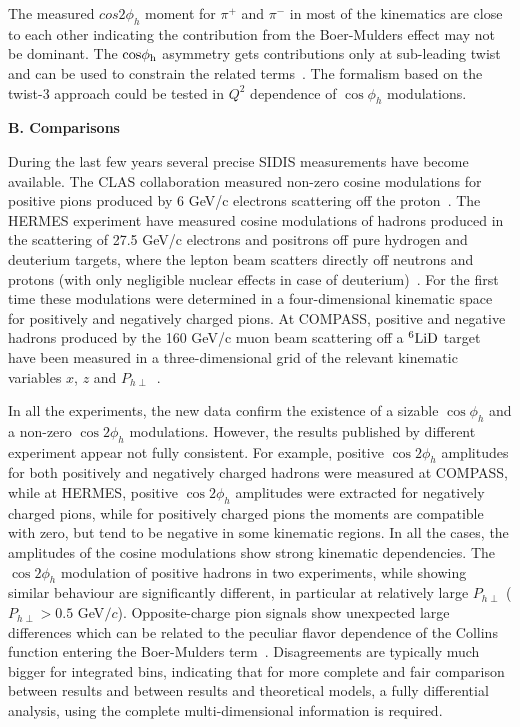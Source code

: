 \documentclass[aps,prl,twocolumn,showpacs,superscriptaddress,groupedaddress]{revtex4-1}  %
\newcommand{\Phperp}{P_{h\perp}}
\begin{document}
The measured $cos 2 \phi_h$ moment for $\pi^+$ and $\pi^-$ in most of the kinematics are close to each other indicating the contribution from the Boer-Mulders effect may not be dominant.
The $\rm cos \phi_h$ asymmetry gets contributions only at sub-leading twist and can be used to constrain the related terms~\cite{Cahn:1978se,Anselmino:2005nn,Berger:1979xz}.
The formalism based on the twist-3 approach could be tested in $Q^2$ dependence of $\cos\phi_h$ modulations.

\begin{center}
\textbf{B. Comparisons} \par
\end{center}
During the last few years several precise SIDIS measurements have become available. The CLAS
collaboration measured non-zero cosine modulations for positive pions produced
by 6 GeV/c electrons scattering off the proton~\cite{Osipenko:2008rv}.  The
HERMES experiment have measured cosine modulations of hadrons produced in the
scattering of 27.5 GeV/c electrons and positrons off pure hydrogen and deuterium
targets, where the lepton beam scatters directly off neutrons and protons (with
only negligible nuclear effects in case of
deuterium)~\cite{Airapetian:2012yg}. For the first time these modulations were
determined in a four-dimensional kinematic space for positively and negatively
charged pions.
At COMPASS, positive and negative hadrons produced by the 160 GeV/c muon beam
scattering off a $\rm ^6LiD$ target have been measured in a three-dimensional
grid of the relevant kinematic variables $x$, $z$ and
$\Phperp$~\cite{Adolph:2014pwc}.

In all the experiments, the new data confirm the existence of a sizable
$\cos\phi_h$ and a non-zero $\cos2\phi_h$ modulations.  However, the results
published by different experiment appear not fully consistent. For example,
positive $\cos2\phi_h$ amplitudes for both positively and negatively charged
hadrons were measured at COMPASS, while at HERMES, positive $\cos 2\phi_h$ amplitudes
were extracted for negatively charged pions, while for positively charged pions
the moments are compatible with zero, but tend to be negative in some kinematic
regions. In all the cases, the amplitudes of the cosine modulations show strong
kinematic dependencies. 
The $\cos2\phi_h$ modulation of positive hadrons in two experiments, while showing similar behaviour are significantly different, in particular at relatively large $\Phperp$  ($\Phperp>0.5$ GeV$/c$).
Opposite-charge pion signals show unexpected large differences which can be related to the peculiar flavor dependence of the Collins function entering the Boer-Mulders term~\cite{Airapetian:2012yg}. Disagreements are typically much bigger for integrated bins, indicating that for 
more complete and fair comparison between results and between results
and theoretical models, a fully differential analysis, using the complete
multi-dimensional information is required.
\end{document}
